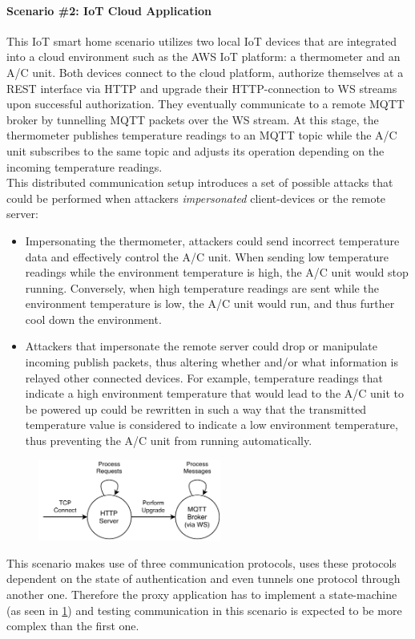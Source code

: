 \paragraph{Scenario \#2: \ac{IoT} Cloud Application} This \ac{IoT} smart home scenario utilizes two local \ac{IoT} devices that are integrated into a cloud environment such as the \ac{AWS} \ac{IoT} platform: a thermometer and an \ac{A/C} unit. Both devices connect to the cloud platform, authorize themselves at a \ac{REST} interface via \ac{HTTP} and upgrade their \ac{HTTP}-connection to \ac{WS} streams upon successful authorization. They eventually communicate to a remote \ac{MQTT} broker by tunnelling \ac{MQTT} packets over the \ac{WS} stream. At this stage, the thermometer publishes temperature readings to an \ac{MQTT} topic while the \ac{A/C} unit subscribes to the same topic and adjusts its operation depending on the incoming temperature readings. \\
This distributed communication setup introduces a set of possible attacks that could be performed when attackers \emph{impersonated} client-devices or the remote server:
\begin{itemize}
    \item Impersonating the thermometer, attackers could send incorrect temperature data and effectively control the \ac{A/C} unit. When sending low temperature readings while the environment temperature is high, the \ac{A/C} unit would stop running. Conversely, when high temperature readings are sent while the environment temperature is low, the \ac{A/C} unit would run, and thus further cool down the environment.
    \item Attackers that impersonate the remote server could drop or manipulate incoming publish packets, thus altering whether and/or what information is relayed other connected devices. For example, temperature readings that indicate a high environment temperature that would lead to the \ac{A/C} unit to be powered up could be rewritten in such a way that the transmitted temperature value is considered to indicate a low environment temperature, thus preventing the \ac{A/C} unit from running automatically.
\end{itemize}

\begin{figure}[h]
    \centering
    \includegraphics[width=6cm]{img/ch04/Statemachine 2.pdf}
    \label{fig:aws-statemachine}
\end{figure}
This scenario makes use of three communication protocols, uses these protocols dependent on the state of authentication and even tunnels one protocol through another one. Therefore the proxy application has to implement a state-machine (as seen in \ref{fig:aws-statemachine}) and testing communication in this scenario is expected to be more complex than the first one.


